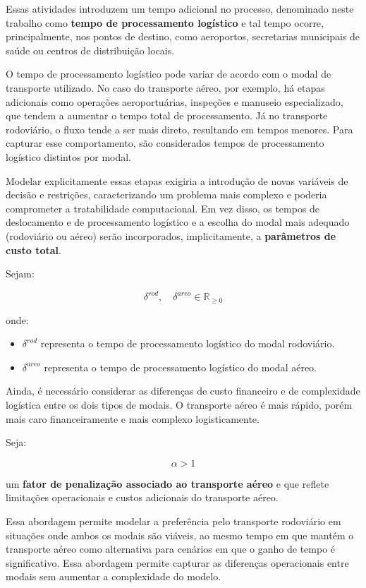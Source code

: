 Essas atividades introduzem um tempo adicional no processo, denominado neste trabalho como \textbf{tempo de processamento logístico} e tal tempo ocorre, principalmente, nos pontos de destino, como aeroportos, secretarias municipais de saúde ou centros de distribuição locais.

O tempo de processamento logístico pode variar de acordo com o modal de transporte utilizado. No caso do transporte aéreo, por exemplo, há etapas adicionais como operações aeroportuárias, inspeções e manuseio especializado, que tendem a aumentar o tempo total de processamento. Já no transporte rodoviário, o fluxo tende a ser mais direto, resultando em tempos menores. Para capturar esse comportamento, são considerados tempos de processamento logístico distintos por modal.

Modelar explicitamente essas etapas exigiria a introdução de novas variáveis de decisão e restrições, caracterizando um problema mais complexo e poderia comprometer a tratabilidade computacional. Em vez disso, os tempos de deslocamento e de processamento logístico e a escolha do modal mais adequado (rodoviário ou aéreo) serão incorporados, implicitamente, a \textbf{parâmetros de custo total}.

Sejam:

\[
\delta^{rod}, \quad \delta^{areo} \in \mathbb{R}_{\geq 0}
\]

onde:
\begin{itemize}
    \item $\delta^{rod}$ representa o tempo de processamento logístico do modal rodoviário.
    \item $\delta^{areo}$ representa o tempo de processamento logístico do modal aéreo.
\end{itemize}

Ainda, é necessário considerar as diferenças de custo financeiro e de complexidade logística entre os dois tipos de modais. O transporte aéreo é mais rápido, porém mais caro financeiramente e mais complexo logisticamente.

Seja:

\[
\alpha > 1
\]

um \textbf{fator de penalização associado ao transporte aéreo} e que reflete limitações operacionais e custos adicionais do transporte aéreo. 

Essa abordagem permite modelar a preferência pelo transporte rodoviário em situações onde ambos os modais são viáveis, ao mesmo tempo em que mantém o transporte aéreo como alternativa para cenários em que o ganho de tempo é significativo. Essa abordagem permite capturar as diferenças operacionais entre modais sem aumentar a complexidade do modelo.

